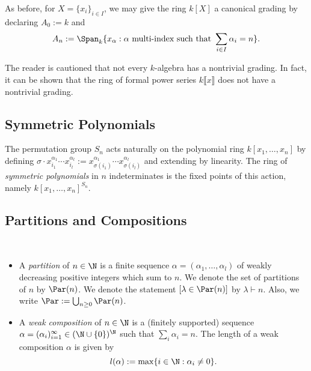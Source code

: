 \documentclass[12pt]{article}
\begin{document}

\begin{keyexample*}
  As before, for $ X = \{x_{i}\}_{i\in I} $, we may give the ring $ k[X] $ a canonical grading by declaring $ A_{0}:=k $ and
  \[
    A_{n} := \Span_{k}\{x_{\alpha}: \alpha \text{ multi-index such that } \sum_{i\in I} \alpha_{i} = n\}.
  \]
\end{keyexample*} 
The reader is cautioned that not every $ k $-algebra has a nontrivial grading. In fact, it can be shown that the ring of formal power series $ k\llbracket x \rrbracket $ does not have a nontrivial grading.



\subsection{Symmetric Polynomials}

\begin{definition}\label{def:sympoly}
  The permutation group $ S_{n} $ acts naturally on the polynomial ring $ k[x_{1},\ldots,x_{n}] $ by defining $ \sigma \cdot x_{i_{1}}^{\alpha_1}\cdots x_{i_l}^{\alpha_{l}} := x_{\sigma(i_{1})}^{\alpha_{1}}\cdots x_{\sigma(i_{l})}^{\alpha_{l}}$ and extending by linearity. The ring of \textit{symmetric polynomials} in $ n $ indeterminates is the fixed points of this action, namely $ k[x_{1},\ldots, x_{n}]^{S_{n}} $.
\end{definition}

\subsection{Partitions and Compositions}
\begin{definition}\label{def:comp}\ 
  \begin{itemize}
    \item A \textit{partition} of $ n\in \N $ is a finite sequence $ \alpha=(\alpha_{1},\ldots, \alpha_{l}) $ of weakly decreasing positive integers which sum to $ n $. We denote the set of partitions of $ n $ by $ \Par(n) $. We denote the statement $ [\lambda\in \Par(n)] $ by $ \lambda\vdash n $. Also, we write $ \Par:=\bigcup_{n\geq0}\Par(n) $.
    \item A \textit{weak composition} of $ n\in \N $ is a (finitely supported) sequence $\alpha=(\alpha_{i})_{i=1}^{\infty}\in (\N\cup\{0\})^{\N}$ such that $ \sum_{i} \alpha_{i} = n $. The length of a weak composition $ \alpha $ is given by
  \[
    l(\alpha) :=\max\{i\in \N: \alpha_{i}\neq 0\}.
  \]
  \end{itemize}

  
\end{definition}
\end{document}
